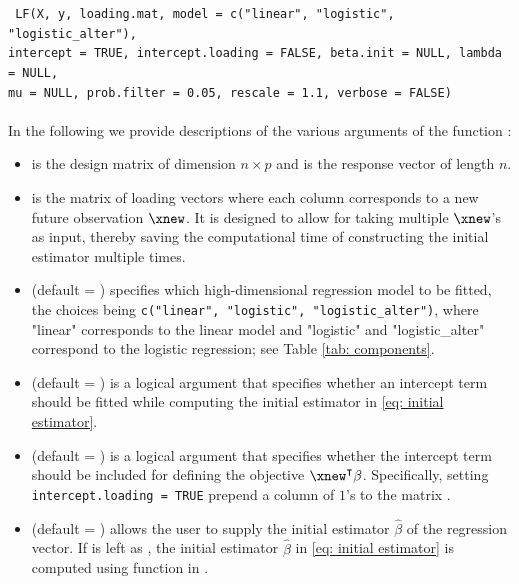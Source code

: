 \noindent\texttt{
LF(X, y, loading.mat, model = c("linear", "logistic", "logistic\_alter"), \\
\indent intercept = TRUE, intercept.loading = FALSE, beta.init = NULL, lambda = NULL,\\
\indent mu = NULL, prob.filter = 0.05, rescale = 1.1,  verbose = FALSE)
}\\
\\
In the following we provide descriptions of the various arguments of the  function :
\begin{itemize}
\item {} is the design matrix of dimension $n \times p$ and  is the response vector of length $n$. 

\item {} is the matrix of loading vectors where each column corresponds to a new future observation $\xnew$. It is designed to allow for taking multiple $\xnew$'s as input, thereby saving the computational time of constructing the initial estimator {multiple times}.

\item {} (default = ) specifies which high-dimensional regression model to be fitted, the choices being \texttt{c("linear", "logistic", "logistic\_alter")}, where "linear" corresponds to the linear model and "logistic" and "logistic\_alter" correspond to the logistic regression; see Table \ref{tab: components}. %

\item {} (default = ) is a logical argument that specifies whether an intercept term should be fitted while computing the initial estimator in \eqref{eq: initial estimator}. 

\item {} (default = ) is a logical argument that specifies whether the intercept term should be included for defining the objective $\xnew^{\intercal}\beta$. Specifically, setting \texttt{intercept.loading = TRUE} prepend a column of $1$'s to the matrix .

\item {} (default = ) allows the user to supply the initial estimator $\widehat{\beta}$ of the regression vector. If  is left as , the initial estimator $\widehat{\beta}$ in \eqref{eq: initial estimator} is computed using function  in . %


\end{itemize}
